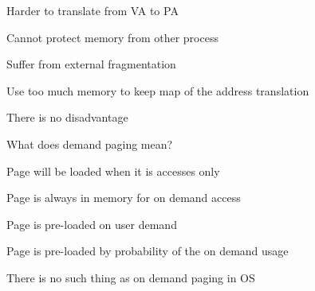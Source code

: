 \begin{questions}
\begin{verticalchoices}
\item Harder to translate from VA to PA
\item Cannot protect memory from other process
\item Suffer from external fragmentation
\item Use too much memory to keep map of the address translation
\item There is no disadvantage
\end{verticalchoices}
\question What does demand paging mean?
\begin{verticalchoices}
\item Page will be loaded when it is accesses only
\item Page is always in memory for on demand access
\item Page is pre-loaded on user demand
\item Page is pre-loaded by probability of the on demand usage
\item There is no such thing as on demand paging in OS
\end{verticalchoices}
\end{questions}\vfill\newpage

